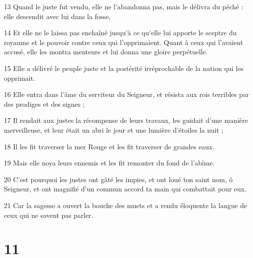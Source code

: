 \par 13 Quand le juste fut vendu, elle ne l'abandonna pas, mais le délivra du péché : elle descendit avec lui dans la fosse,
\par 14 Et elle ne le laissa pas enchaîné jusqu'à ce qu'elle lui apporte le sceptre du royaume et le pouvoir contre ceux qui l'opprimaient. Quant à ceux qui l'avaient accusé, elle les montra menteurs et lui donna une gloire perpétuelle.
\par 15 Elle a délivré le peuple juste et la postérité irréprochable de la nation qui les opprimait.
\par 16 Elle entra dans l'âme du serviteur du Seigneur, et résista aux rois terribles par des prodiges et des signes ;
\par 17 Il rendait aux justes la récompense de leurs travaux, les guidait d'une manière merveilleuse, et leur était un abri le jour et une lumière d'étoiles la nuit ;
\par 18 Il les fit traverser la mer Rouge et les fit traverser de grandes eaux.
\par 19 Mais elle noya leurs ennemis et les fit remonter du fond de l'abîme.
\par 20 C'est pourquoi les justes ont gâté les impies, et ont loué ton saint nom, ô Seigneur, et ont magnifié d'un commun accord ta main qui combattait pour eux.
\par 21 Car la sagesse a ouvert la bouche des muets et a rendu éloquente la langue de ceux qui ne savent pas parler.

\chapter{11}

